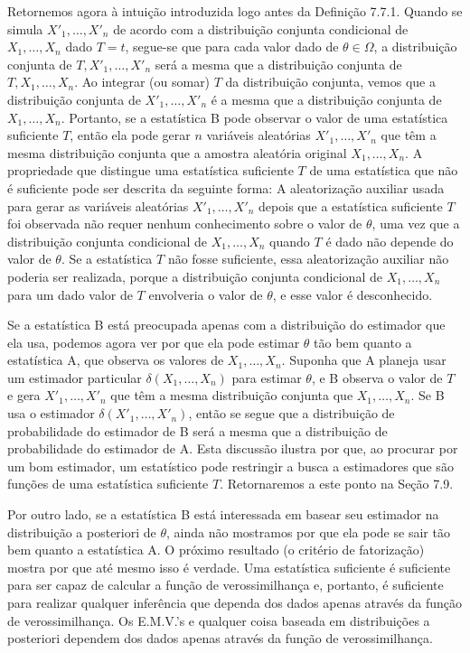 Retornemos agora à intuição introduzida logo antes da Definição 7.7.1. Quando se simula $X'_1, \dots, X'_n$ de acordo com a distribuição conjunta condicional de $X_1, \dots, X_n$ dado $T=t$, segue-se que para cada valor dado de $\theta \in \Omega$, a distribuição conjunta de $T, X'_1, \dots, X'_n$ será a mesma que a distribuição conjunta de $T, X_1, \dots, X_n$. Ao integrar (ou somar) $T$ da distribuição conjunta, vemos que a distribuição conjunta de $X'_1, \dots, X'_n$ é a mesma que a distribuição conjunta de $X_1, \dots, X_n$. Portanto, se a estatística B pode observar o valor de uma estatística suficiente $T$, então ela pode gerar $n$ variáveis aleatórias $X'_1, \dots, X'_n$ que têm a mesma distribuição conjunta que a amostra aleatória original $X_1, \dots, X_n$. A propriedade que distingue uma estatística suficiente $T$ de uma estatística que não é suficiente pode ser descrita da seguinte forma: A aleatorização auxiliar usada para gerar as variáveis aleatórias $X'_1, \dots, X'_n$ depois que a estatística suficiente $T$ foi observada não requer nenhum conhecimento sobre o valor de $\theta$, uma vez que a distribuição conjunta condicional de $X_1, \dots, X_n$ quando $T$ é dado não depende do valor de $\theta$. Se a estatística $T$ não fosse suficiente, essa aleatorização auxiliar não poderia ser realizada, porque a distribuição conjunta condicional de $X_1, \dots, X_n$ para um dado valor de $T$ envolveria o valor de $\theta$, e esse valor é desconhecido.

\vspace{\baselineskip}

Se a estatística B está preocupada apenas com a distribuição do estimador que ela usa, podemos agora ver por que ela pode estimar $\theta$ tão bem quanto a estatística A, que observa os valores de $X_1, \dots, X_n$. Suponha que A planeja usar um estimador particular $\delta(X_1, \dots, X_n)$ para estimar $\theta$, e B observa o valor de $T$ e gera $X'_1, \dots, X'_n$ que têm a mesma distribuição conjunta que $X_1, \dots, X_n$. Se B usa o estimador $\delta(X'_1, \dots, X'_n)$, então se segue que a distribuição de probabilidade do estimador de B será a mesma que a distribuição de probabilidade do estimador de A. Esta discussão ilustra por que, ao procurar por um bom estimador, um estatístico pode restringir a busca a estimadores que são funções de uma estatística suficiente $T$. Retornaremos a este ponto na Seção 7.9.

\vspace{\baselineskip}

Por outro lado, se a estatística B está interessada em basear seu estimador na distribuição a posteriori de $\theta$, ainda não mostramos por que ela pode se sair tão bem quanto a estatística A. O próximo resultado (o critério de fatorização) mostra por que até mesmo isso é verdade. Uma estatística suficiente é suficiente para ser capaz de calcular a função de verossimilhança e, portanto, é suficiente para realizar qualquer inferência que dependa dos dados apenas através da função de verossimilhança. Os E.M.V.'s e qualquer coisa baseada em distribuições a posteriori dependem dos dados apenas através da função de verossimilhança.


